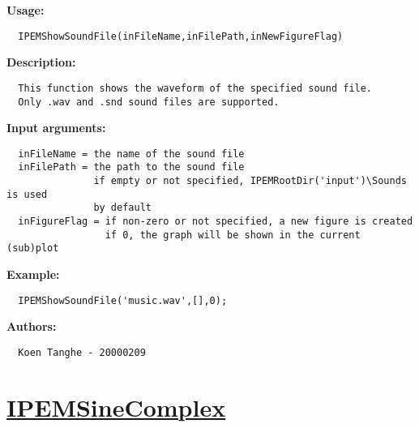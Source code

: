 \textbf{Usage:}
\begin{verbatim}  IPEMShowSoundFile(inFileName,inFilePath,inNewFigureFlag)

\end{verbatim}
\textbf{Description:}
\begin{verbatim}  This function shows the waveform of the specified sound file.
  Only .wav and .snd sound files are supported.

\end{verbatim}
\textbf{Input arguments:}
\begin{verbatim}  inFileName = the name of the sound file
  inFilePath = the path to the sound file
               if empty or not specified, IPEMRootDir('input')\Sounds is used
               by default
  inFigureFlag = if non-zero or not specified, a new figure is created
                 if 0, the graph will be shown in the current (sub)plot

\end{verbatim}
\textbf{Example:}
\begin{verbatim}  IPEMShowSoundFile('music.wav',[],0);

\end{verbatim}
\textbf{Authors:}
\begin{verbatim}  Koen Tanghe - 20000209
\end{verbatim}


\newpage
\section*{\hyperlink{Concepts:IPEMSineComplex}{IPEMSineComplex}}
\hypertarget{FuncRef:IPEMSineComplex}{}

